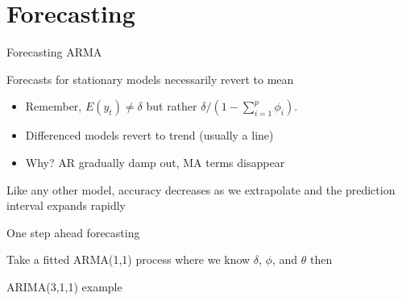 \documentclass[11pt,ignorenonframetext,]{beamer}
\begin{document}
\begin{frame}

\end{frame}

\hypertarget{forecasting}{%
\section{Forecasting}\label{forecasting}}

\begin{frame}[t]{Forecasting ARMA}
\protect\hypertarget{forecasting-arma}{}

Forecasts for stationary models necessarily revert to mean

\begin{itemize}
\item
  Remember, \(E(y_t) \ne \delta\) but rather
  \(\delta / (1 - \sum_{i=1}^p \phi_i)\).
\item
  Differenced models revert to trend (usually a line)
\item
  Why? AR gradually damp out, MA terms disappear
\end{itemize}

\vspace{5mm}

Like any other model, accuracy decreases as we extrapolate and the
prediction interval expands rapidly

\end{frame}

\begin{frame}[t]{One step ahead forecasting}
\protect\hypertarget{one-step-ahead-forecasting}{}

Take a fitted ARMA(1,1) process where we know \(\delta\), \(\phi\), and
\(\theta\) then

\end{frame}

\begin{frame}{ARIMA(3,1,1) example}
\protect\hypertarget{arima311-example}{}

\end{frame}
\end{document}
